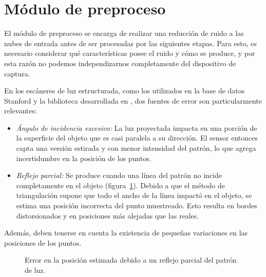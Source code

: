 \section{Módulo de preproceso}
El módulo de preproceso se encarga de realizar una reducción de ruido a las nubes de entrada
antes de ser procesadas por las siguientes etapas.
Para esto, es necesario considerar qué características posee el ruido y cómo se produce,
y por esta razón no podemos independizarnos completamente del dispositivo de captura.

En los escáneres de luz estructurada,
como los utilizados en la base de datos Stanford\cite{Turk:1994:ZPM:192161.192241}
y la biblioteca desarrollada en \cite{Pancho},
dos fuentes de error son particularmente relevantes:
\begin{itemize}
	\item \emph{Ángulo de incidencia excesivo:}
		La luz proyectada impacta en una porción de la superficie del objeto
		que es casi paralela a su dirección.
		El sensor entonces capta una versión estirada y con menor intensidad del patrón, lo que 
		agrega incertidumbre en la posición de los puntos.
	\item \emph{Reflejo parcial:}
		Se produce cuando una línea del patrón no incide completamente en el objeto (figura~\ref{fig:error_adquisicion}).
		Debido a que el método de triangulación supone que todo el ancho de la línea impactó en el objeto,
		se estima una posición incorrecta del punto muestreado.
		Esto resulta en bordes distorsionados y en posiciones más alejadas que las reales.\cite{Turk:1994:ZPM:192161.192241}
\end{itemize}
Además, deben tenerse en cuenta la existencia de pequeñas variaciones en las posiciones de los puntos.

\begin{figure}
	\caption{\label{fig:error_adquisicion}Error en la posición estimada debido a un reflejo parcial del patrón de luz.}
\end{figure}

